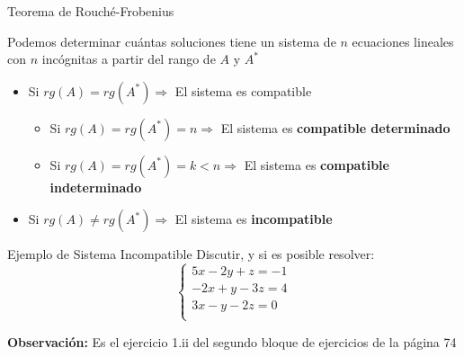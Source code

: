 \documentclass[11pt]{beamer}
\begin{document}
\begin{frame}{Teorema de Rouché-Frobenius}

    Podemos determinar cuántas soluciones tiene un sistema de $n$ ecuaciones lineales con $n$ incógnitas a partir del rango de $A$ y $A^*$
    \begin{block}{}
    \begin{itemize}[<+->]
    \item Si $rg(A)=rg(A^*) \Rightarrow$ El sistema es compatible
    \begin{itemize}
        \item Si $rg(A)=rg(A^*)=n \Rightarrow$ El sistema es \textbf{compatible determinado}
        \item Si $rg(A)=rg(A^*)=k<n \Rightarrow$ El sistema es \textbf{compatible indeterminado}
        
    \end{itemize}
    \item Si $rg(A)\neq rg(A^*) \Rightarrow$ El sistema es \textbf{incompatible}
    \end{itemize}
    \end{block}

\end{frame}


\begin{frame}{Ejemplo de Sistema Incompatible}
    Discutir, y si es posible resolver:
$$\left\{ \begin{matrix}5 x - 2 y + z = -1 \\ - 2 x + y - 3 z = 4 \\ 3 x - y - 2 z = 0 \\ \end{matrix}\right.$$

\textbf{Observación:} Es el ejercicio 1.ii del segundo bloque de ejercicios de la página 74

\end{frame}
\end{document}
